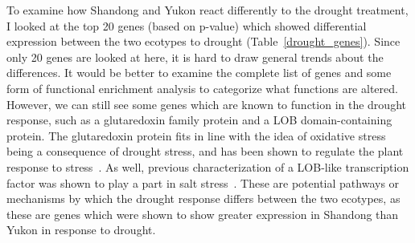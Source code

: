 \documentclass[12pt]{article}
\begin{document}
	To examine how Shandong and Yukon react differently to the drought treatment, I looked at the top 20 genes (based on p-value) which showed differential expression between the two ecotypes to drought (Table~\ref{drought_genes}). Since only 20 genes are looked at here, it is hard to draw general trends about the differences. It would be better to examine the complete list of genes and some form of functional enrichment analysis to categorize what functions are altered. However, we can still see some genes which are known to function in the drought response, such as a glutaredoxin family protein and a LOB domain-containing protein. The glutaredoxin protein fits in line with the idea of oxidative stress being a consequence of drought stress, and has been shown to regulate the plant response to stress~\cite{guo2010tomato}. As well, previous characterization of a LOB-like transcription factor was shown to play a part in salt stress~\cite{ariel2010lob}. These are potential pathways or mechanisms by which the drought response differs between the two ecotypes, as these are genes which were shown to show greater expression in Shandong than Yukon in response to drought.
	
\end{document}

